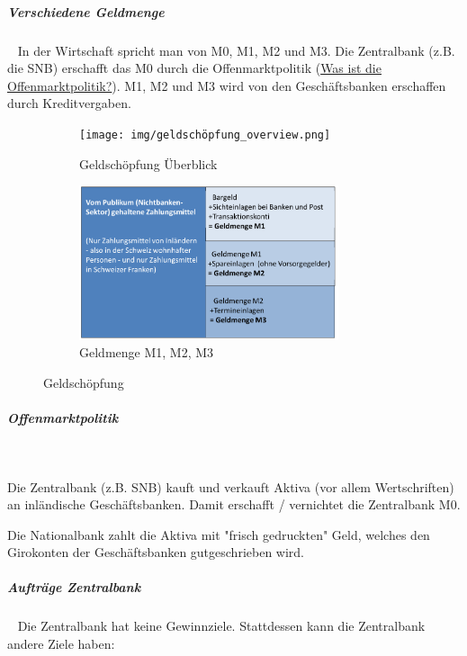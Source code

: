 \documentclass[11pt,twoside,landscape]{article}
\begin{document}
\begin{multicols}{3}
\subparagraph{Verschiedene Geldmenge} \
\label{sec:orgdd3b455}
In der Wirtschaft spricht man von M0, M1, M2 und M3.
Die Zentralbank (z.B. die SNB) erschafft das M0 durch die Offenmarktpolitik (\href{../../../roam/20220615113801-was_ist_die_offenmarktpolitik.org}{Was ist die Offenmarktpolitik?}).
M1, M2 und M3 wird von den Geschäftsbanken erschaffen durch Kreditvergaben.

\begin{figure}[H]
  \centering
  \begin{subfigure}{0.4\textwidth}
    \centering
    \texttt{[image: img/geldschöpfung\_overview.png]}
    \caption{Geldschöpfung Überblick \label{fig:geldschöpfung-ueberblick}}
  \end{subfigure}
  \hfill
  \begin{subfigure}{0.4\textwidth}
    \centering
    \includegraphics[width=3in]{img/geldmenge_m1_m2_m3.png}
    \caption{Geldmenge M1, M2, M3 \label{fig:geldmenge-m1-m2-m3}}
  \end{subfigure}
  \caption{
    \label{fig:gelschöpfung}
    Geldschöpfung
  }
\end{figure}

\subparagraph{Offenmarktpolitik} \
\label{sec:org7a54a1e}

Die Zentralbank (z.B. SNB) kauft und verkauft Aktiva (vor allem Wertschriften) an inländische Geschäftsbanken.
Damit erschafft / vernichtet die Zentralbank M0.

Die Nationalbank zahlt die Aktiva mit "frisch gedruckten" Geld, welches den Girokonten der Geschäftsbanken gutgeschrieben wird.

\subparagraph{Aufträge Zentralbank} \
\label{sec:org0c5e47f}
Die Zentralbank hat keine Gewinnziele.
Stattdessen kann die Zentralbank andere Ziele haben:


\end{multicols}
\end{document}

